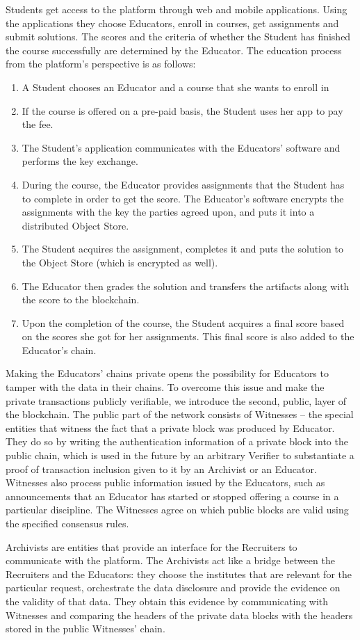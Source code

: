 Students get access to the platform through web and mobile applications. Using the applications they choose Educators, enroll in courses, get assignments and submit solutions. The scores and the criteria of whether the Student has finished the course successfully are determined by the Educator. The education process from the platform’s perspective is as follows:
\begin{enumerate}
\item A Student chooses an Educator and a course that she wants to enroll in
\item If the course is offered on a pre-paid basis, the Student uses her app to pay the fee.
\item The Student’s application communicates with the Educators’ software and performs the key exchange.
\item During the course, the Educator provides assignments that the Student has to complete in order to get the score. The Educator’s software encrypts the assignments with the key the parties agreed upon, and puts it into a distributed Object Store.
\item The Student acquires the assignment, completes it and puts the solution to the Object Store (which is encrypted as well).
\item The Educator then grades the solution and transfers the artifacts along with the score to the blockchain.
\item Upon the completion of the course, the Student acquires a final score based on the scores she got for her assignments. This final score is also added to the Educator’s chain.
\end{enumerate}

Making the Educators' chains private opens the possibility for Educators to tamper with the data in their chains. To overcome this issue and make the private transactions publicly verifiable, we introduce the second, public, layer of the blockchain. The public part of the network consists
of Witnesses – the special entities that witness the fact that a private block was produced by Educator.
They do so by writing the authentication information of a private block into the public chain, which is used in the future by an arbitrary Verifier to substantiate a proof of transaction inclusion given to it by an Archivist or an Educator. Witnesses also process public information issued by the Educators, such as announcements that an Educator has started or stopped offering a course in a particular discipline. The Witnesses agree on which public blocks are valid using the specified consensus rules.

Archivists are entities that provide an interface for the Recruiters to communicate with the platform. The Archivists act like a bridge between the Recruiters and the Educators: they choose the institutes that are relevant for the particular request, orchestrate the data disclosure and provide the evidence on the validity of that data. They obtain this evidence by communicating with Witnesses and comparing the headers of the private data blocks with the headers stored in the public Witnesses' chain.
